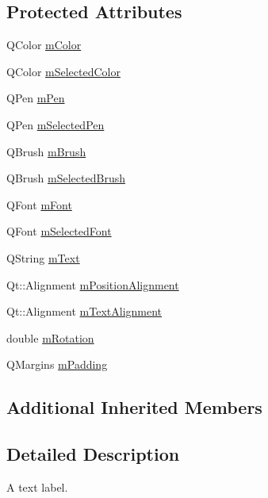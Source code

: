 \subsection*{Protected Attributes}
\begin{DoxyCompactItemize}
\item 
Q\+Color \hyperlink{class_q_c_p_item_text_a8407f284ad867f627878cc26ef433d08}{m\+Color}
\item 
Q\+Color \hyperlink{class_q_c_p_item_text_a7eb64e42f5f7998a97d8907ad25933c1}{m\+Selected\+Color}
\item 
Q\+Pen \hyperlink{class_q_c_p_item_text_aa02388705dbbff1bf7b8aa872b5f579c}{m\+Pen}
\item 
Q\+Pen \hyperlink{class_q_c_p_item_text_a8eaec649606d6ead2d8d4dcb5691777c}{m\+Selected\+Pen}
\item 
Q\+Brush \hyperlink{class_q_c_p_item_text_a2535911875faa459b8337f2efccb5cb8}{m\+Brush}
\item 
Q\+Brush \hyperlink{class_q_c_p_item_text_a28ccd097b42a216d81db9c6869f54a59}{m\+Selected\+Brush}
\item 
Q\+Font \hyperlink{class_q_c_p_item_text_a1dc87fe2a824820d549ffd7e644eef8d}{m\+Font}
\item 
Q\+Font \hyperlink{class_q_c_p_item_text_a6702f141fae590b2f4f1ec02fe9f8bd5}{m\+Selected\+Font}
\item 
Q\+String \hyperlink{class_q_c_p_item_text_a2dec3e08c11f51639629374ecec3bd62}{m\+Text}
\item 
Qt\+::\+Alignment \hyperlink{class_q_c_p_item_text_a6c27f7dc1a962a04b32430cf99f04654}{m\+Position\+Alignment}
\item 
Qt\+::\+Alignment \hyperlink{class_q_c_p_item_text_acdb2e50c38e83da00f083771efbd213f}{m\+Text\+Alignment}
\item 
double \hyperlink{class_q_c_p_item_text_ac37df0061552225d2277e1ee3b48f2cb}{m\+Rotation}
\item 
Q\+Margins \hyperlink{class_q_c_p_item_text_ae7b3ef0ce6046efd4b346d28f2e1fb67}{m\+Padding}
\end{DoxyCompactItemize}
\subsection*{Additional Inherited Members}


\subsection{Detailed Description}
A text label. 

